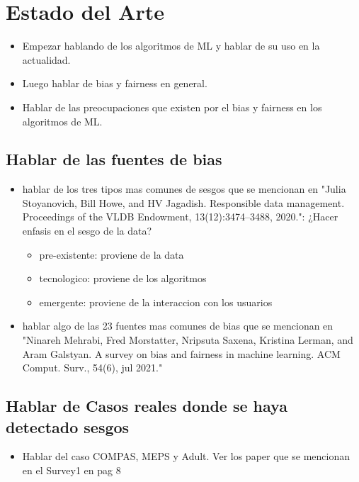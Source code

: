 \chapter{Estado del Arte}\label{chapter:state-of-the-art}


\begin{itemize}
    \item Empezar hablando de los algoritmos de ML y hablar de su uso en la actualidad.
    \item Luego hablar de bias y fairness en general.
    \item Hablar de las preocupaciones que existen por el bias y fairness en los algoritmos de ML.
\end{itemize}

\section{Hablar de las fuentes de bias}
\begin{itemize}
    \item hablar de los tres tipos mas comunes de sesgos que se mencionan en "Julia Stoyanovich, Bill Howe, and HV Jagadish. Responsible data management. Proceedings of the VLDB
    Endowment, 13(12):3474–3488, 2020.": ¿Hacer enfasis en el sesgo de la data?
    \begin{itemize}
        \item pre-existente: proviene de la data
        \item tecnologico: proviene de los algoritmos
        \item emergente: proviene de la interaccion con los usuarios
    \end{itemize}
    \item hablar algo de las 23 fuentes mas comunes de bias 
    que se mencionan en "Ninareh Mehrabi, Fred Morstatter, Nripsuta Saxena, Kristina Lerman, and Aram Galstyan. A survey on bias and
    fairness in machine learning. ACM Comput. Surv., 54(6), jul 2021."
\end{itemize}

\section{Hablar de Casos reales donde se haya detectado sesgos}

    \begin{itemize}
        \item Hablar del caso COMPAS, MEPS y Adult. Ver los paper que se mencionan en el Survey1 en pag 8
    \end{itemize}

